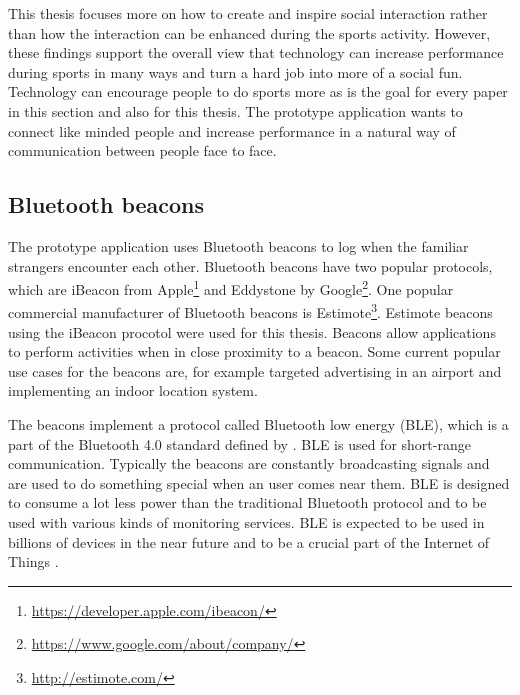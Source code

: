This thesis focuses more on how to create and inspire social interaction rather than how the interaction can be enhanced during the sports activity. However, these findings support the overall view that technology can increase performance during sports in many ways and turn a hard job into more of a social fun. Technology can encourage people to do sports more as is the goal for every paper in this section and also for this thesis. The prototype application wants to connect like minded people and increase performance in a natural way of communication between people face to face. 

\subsection{Bluetooth beacons}

The prototype application uses Bluetooth beacons to log when the familiar strangers encounter each other. Bluetooth beacons have two popular protocols, which are iBeacon from Apple\footnote{\url{https://developer.apple.com/ibeacon/}} and Eddystone by Google\footnote{\url{https://www.google.com/about/company/}}. One popular commercial manufacturer of Bluetooth beacons is Estimote\footnote{\url{http://estimote.com/}}. Estimote beacons using the iBeacon procotol were used for this thesis. Beacons allow applications to perform activities when in close proximity to a beacon. Some current popular use cases for the beacons are, for example targeted advertising in an airport and implementing an indoor location system.

The beacons implement a protocol called Bluetooth low energy (BLE), which is a part of the Bluetooth 4.0 standard defined by \cite{bluetooth}. BLE is used for short-range communication. Typically the beacons are constantly broadcasting signals and are used to do something special when an user comes near them. BLE is designed to consume a lot less power than the traditional Bluetooth protocol and to be used with various kinds of monitoring services. BLE is expected to be used in billions of devices in the near future and to be a crucial part of the Internet of Things \citep{bluetoothOverview}.

